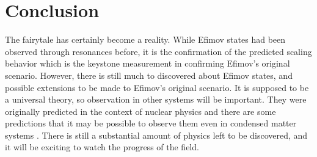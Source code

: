 \documentclass[prl,onecolumn,amsmath,amssymb,titlepage,nofootinbib,preprint]{revtex4-1}
\begin{document}
\section{Conclusion}

The fairytale has certainly become a reality.  While Efimov states had been observed through resonances before, it is the confirmation of the predicted scaling behavior which is the keystone measurement in confirming Efimov's original scenario.  However, there is still much to discovered about Efimov states, and possible extensions to be made to Efimov's original scenario.  It is supposed to be a universal theory, so observation in other systems will be important. They were originally predicted in the context of nuclear physics and there are some predictions that it may be possible to observe them even in condensed matter systems \cite{Nishida2013}.  There is still a substantial amount of physics left to be discovered, and it will be exciting to watch the progress of the field.


\end{document}
